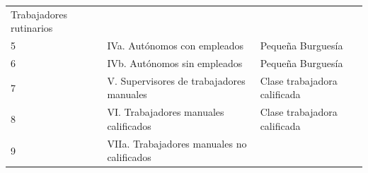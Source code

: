 \documentclass[
]{book}
\begin{document}
\begin{longtable}[]{@{}lll@{}}
\begin{minipage}[t]{0.29\columnwidth}
Trabajadores rutinarios\strut
\end{minipage}\tabularnewline
\begin{minipage}[t]{0.07\columnwidth}\raggedright
5\strut
\end{minipage} & \begin{minipage}[t]{0.55\columnwidth}\raggedright
IVa. Autónomos con empleados\strut
\end{minipage} & \begin{minipage}[t]{0.29\columnwidth}\raggedright
Pequeña Burguesía\strut
\end{minipage}\tabularnewline
\begin{minipage}[t]{0.07\columnwidth}\raggedright
6\strut
\end{minipage} & \begin{minipage}[t]{0.55\columnwidth}\raggedright
IVb. Autónomos sin empleados\strut
\end{minipage} & \begin{minipage}[t]{0.29\columnwidth}\raggedright
Pequeña Burguesía\strut
\end{minipage}\tabularnewline
\begin{minipage}[t]{0.07\columnwidth}\raggedright
7\strut
\end{minipage} & \begin{minipage}[t]{0.55\columnwidth}\raggedright
V. Supervisores de trabajadores manuales\strut
\end{minipage} & \begin{minipage}[t]{0.29\columnwidth}\raggedright
Clase trabajadora calificada\strut
\end{minipage}\tabularnewline
\begin{minipage}[t]{0.07\columnwidth}\raggedright
8\strut
\end{minipage} & \begin{minipage}[t]{0.55\columnwidth}\raggedright
VI. Trabajadores manuales calificados\strut
\end{minipage} & \begin{minipage}[t]{0.29\columnwidth}\raggedright
Clase trabajadora calificada\strut
\end{minipage}\tabularnewline
\begin{minipage}[t]{0.07\columnwidth}\raggedright
9\strut
\end{minipage} & \begin{minipage}[t]{0.55\columnwidth}\raggedright
VIIa. Trabajadores manuales no calificados\strut
\end{minipage} & \begin{minipage}[t]{0.29\columnwidth}\raggedright

\end{minipage}
\end{longtable}
\end{document}

